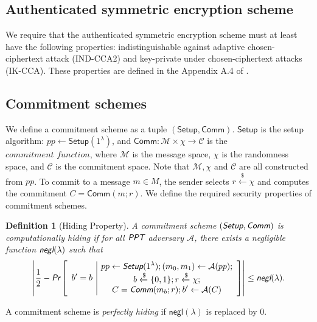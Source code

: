 \documentclass{article}
\theoremstyle{plain}
\newtheorem{definition}{Definition}[section]
\theoremstyle{remark}
\begin{document}
\subsection{Authenticated symmetric encryption scheme}\label{sec-symm}
We require that the authenticated symmetric encryption scheme must at least have the following properties: indistinguishable against adaptive chosen-ciphertext attack (IND-CCA2) and key-private under chosen-ciphertext attacks (IK-CCA). These properties are defined in the Appendix A.4 of \cite{omniring}.

\subsection{Commitment schemes}\label{Comm}

We define a commitment scheme as a tuple $(\textsf{Setup}, \textsf{Comm})$. $\textsf{Setup}$ is the setup algorithm: $pp\leftarrow\textsf{Setup}(1^{\lambda})$, and $\textsf{Comm}:\mathcal{M}\times{\chi}\rightarrow\mathcal{C}$ is the $\textit{commitment function}$, where $\mathcal{M}$ is the message space, $\chi$ is the randomness space, and $\mathcal{C}$ is the commitment space. Note that $\mathcal{M}, \chi$ and $\mathcal{C}$ are all constructed from $pp$.
To commit to a message $m \in M$, the sender selects $r\xleftarrow{\$}\chi$ and computes the commitment $C = \textsf{Comm}(m; r)$. We define the required security properties of commitment schemes.

\begin{definition}[Hiding Property]
A commitment scheme $(\emph{\textsf{Setup}}, \emph{\textsf{Comm}})$ is computationally hiding if for all $\emph{\textsf{PPT}}$ adversary $\mathcal{A}$, there exists a negligible function $\emph{\textsf{negl}}(\lambda)$ such that
\begin{align*}
\left| \frac{1}{2} - \emph{\textsf{Pr}}\left[
\begin{array}{c|c}
    \begin{gathered}
        b' = b
    \end{gathered}
    &
    \begin{gathered}
        pp\leftarrow\emph{\textsf{Setup}}(1^{\lambda}); (m_0, m_1)\leftarrow\mathcal{A}(pp); \\
        b\xleftarrow{\$}\{0,1\}; r \xleftarrow{\$}\chi; \\
        C = \emph{\textsf{Comm}}(m_b; r); b'\leftarrow\mathcal{A}(C)
    \end{gathered}
\end{array}
\right]\right|
\le \emph{\textsf{negl}}(\lambda).
\end{align*}
\end{definition}
A commitment scheme is \textit{perfectly hiding} if $\textsf{negl}(\lambda)$ is replaced by $0$.
\end{document}
